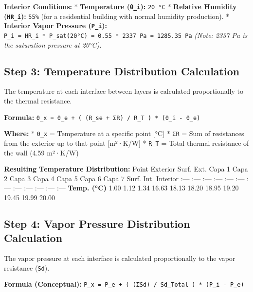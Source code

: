 \documentclass[
  10pt,
  letterpaper,
]{scrbook}
\begin{document}
\textbf{Interior Conditions:} * \textbf{Temperature (\texttt{θ\_i}):}
\texttt{20\ °C} * \textbf{Relative Humidity (\texttt{HR\_i}):}
\texttt{55\%} (for a residential building with normal humidity
production). * \textbf{Interior Vapor Pressure (\texttt{P\_i}):}
\texttt{P\_i\ =\ HR\_i\ *\ P\_sat(20°C)\ =\ 0.55\ *\ 2337\ Pa\ =\ 1285.35\ Pa}
\emph{(Note: 2337 Pa is the saturation pressure at 20°C).}

\subsection{Step 3: Temperature Distribution
Calculation}\label{step-3-temperature-distribution-calculation}

The temperature at each interface between layers is calculated
proportionally to the thermal resistance.

\textbf{Formula:}
\texttt{θ\_x\ =\ θ\_e\ +\ (\ (R\_se\ +\ ΣR)\ /\ R\_T\ )\ *\ (θ\_i\ -\ θ\_e)}

\textbf{Where:} * \texttt{θ\_x} = Temperature at a specific point
{[}°C{]} * \texttt{ΣR} = Sum of resistances from the exterior up to that
point {[}m²·K/W{]} * \texttt{R\_T} = Total thermal resistance of the
wall (4.59 m²·K/W)

\textbf{Resulting Temperature Distribution:} \textbar{} Point \textbar{}
Exterior \textbar{} Surf. Ext. \textbar{} Capa 1 \textbar{} Capa 2
\textbar{} Capa 3 \textbar{} Capa 4 \textbar{} Capa 5 \textbar{} Capa 6
\textbar{} Capa 7 \textbar{} Surf. Int. \textbar{} Interior \textbar{}
\textbar{} :--- \textbar{} :--- \textbar{} :--- \textbar{} :---
\textbar{} :--- \textbar{} :--- \textbar{} :--- \textbar{} :---
\textbar{} :--- \textbar{} :--- \textbar{} :--- \textbar{} :---
\textbar{} \textbar{} \textbf{Temp. (°C)} \textbar{} 1.00 \textbar{}
1.12 \textbar{} 1.34 \textbar{} 16.63 \textbar{} 18.13 \textbar{} 18.20
\textbar{} 18.95 \textbar{} 19.20 \textbar{} 19.45 \textbar{} 19.99
\textbar{} 20.00 \textbar{}

\subsection{Step 4: Vapor Pressure Distribution
Calculation}\label{step-4-vapor-pressure-distribution-calculation}

The vapor pressure at each interface is calculated proportionally to the
vapor resistance (\texttt{Sd}).

\textbf{Formula (Conceptual):}
\texttt{P\_x\ =\ P\_e\ +\ (\ (ΣSd)\ /\ Sd\_Total\ )\ *\ (P\_i\ -\ P\_e)}
\end{document}
